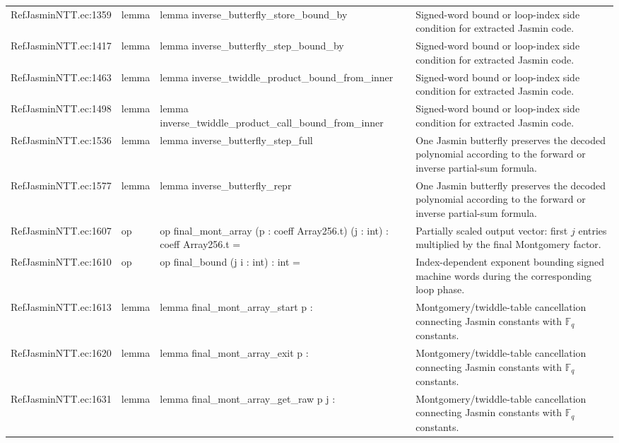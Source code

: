 \documentclass[10pt]{article}
\begin{document}
\begin{longtable}{L{0.11\textwidth}L{0.05\textwidth}L{0.38\textwidth}L{0.42\textwidth}}
RefJasminNTT.\allowbreak{}ec:\allowbreak{}1359 & lemma & {\ttfamily\scriptsize lemma inverse\_butterfly\_store\_bound\_by} & Signed-word bound or loop-index side condition for extracted Jasmin code. \\
RefJasminNTT.\allowbreak{}ec:\allowbreak{}1417 & lemma & {\ttfamily\scriptsize lemma inverse\_butterfly\_step\_bound\_by} & Signed-word bound or loop-index side condition for extracted Jasmin code. \\
RefJasminNTT.\allowbreak{}ec:\allowbreak{}1463 & lemma & {\ttfamily\scriptsize lemma inverse\_twiddle\_product\_bound\_from\_inner} & Signed-word bound or loop-index side condition for extracted Jasmin code. \\
RefJasminNTT.\allowbreak{}ec:\allowbreak{}1498 & lemma & {\ttfamily\scriptsize lemma inverse\_twiddle\_product\_call\_bound\_from\_inner} & Signed-word bound or loop-index side condition for extracted Jasmin code. \\
RefJasminNTT.\allowbreak{}ec:\allowbreak{}1536 & lemma & {\ttfamily\scriptsize lemma inverse\_butterfly\_step\_full} & One Jasmin butterfly preserves the decoded polynomial according to the forward or inverse partial-sum formula. \\
RefJasminNTT.\allowbreak{}ec:\allowbreak{}1577 & lemma & {\ttfamily\scriptsize lemma inverse\_butterfly\_repr} & One Jasmin butterfly preserves the decoded polynomial according to the forward or inverse partial-sum formula. \\
RefJasminNTT.\allowbreak{}ec:\allowbreak{}1607 & op & {\ttfamily\scriptsize op final\_mont\_array (p : coeff Array256.t) (j : int) : coeff Array256.t =} & Partially scaled output vector: first $j$ entries multiplied by the final Montgomery factor. \\
RefJasminNTT.\allowbreak{}ec:\allowbreak{}1610 & op & {\ttfamily\scriptsize op final\_bound (j i : int) : int =} & Index-dependent exponent bounding signed machine words during the corresponding loop phase. \\
RefJasminNTT.\allowbreak{}ec:\allowbreak{}1613 & lemma & {\ttfamily\scriptsize lemma final\_mont\_array\_start p :} & Montgomery/twiddle-table cancellation connecting Jasmin constants with $\mathbb F_q$ constants. \\
RefJasminNTT.\allowbreak{}ec:\allowbreak{}1620 & lemma & {\ttfamily\scriptsize lemma final\_mont\_array\_exit p :} & Montgomery/twiddle-table cancellation connecting Jasmin constants with $\mathbb F_q$ constants. \\
RefJasminNTT.\allowbreak{}ec:\allowbreak{}1631 & lemma & {\ttfamily\scriptsize lemma final\_mont\_array\_get\_raw p j :} & Montgomery/twiddle-table cancellation connecting Jasmin constants with $\mathbb F_q$ constants. \\

\end{longtable}
\end{document}
